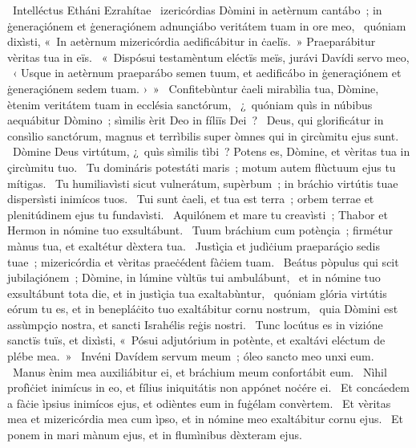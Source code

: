 {~Intelléctus Etháni Ezrahítae}
{%
~izericórdias Dòmini in aetèrnum cantábo~; in ġeneraçiónem et ġeneraçiónem adnunçiábo veritátem tuam in ore meo, 
~quóniam dixìsti, «~In aetèrnum mizericórdia aedificábitur in ċaelïs.~» Praeparábitur vèritas tua in eïs. 
~«~Dispósui testamèntum eléctïs meïs, jurávi Davídi servo meo, 
~‹ Usque in aetèrnum praeparábo semen tuum, et aedificábo in ġeneraçiónem et ġeneraçiónem sedem tuam. ›~»
~Confitebùntur ċaeli mirabìlia tua, Dòmine, ètenim veritátem tuam in ecclésia sanctórum, 
~¿~quóniam quìs in núbibus aequábitur Dòmino~; sìmilis èrit Deo in fíliïs Dei~? 
~Deus, qui glorificátur in consìlio sanctórum, magnus et terrìbilis super òmnes qui in çircùmitu ejus sunt. 
~Dòmine Deus virtútum, ¿~quìs sìmilis tìbi~? Potens es, Dòmine, et vèritas tua in çircùmitu tuo. 
~Tu domináris potestáti maris~; motum autem flùctuum ejus tu mítigas. 
~Tu humiliavìsti sicut vulnerátum, supèrbum~; in bráchio virtútis tuae dispersìsti inimícos tuos. 
~Tui sunt ċaeli, et tua est terra~; orbem terrae et plenitúdinem ejus tu fundavìsti. 
~Aquilónem et mare tu creavìsti~; Thabor et Hermon in nómine tuo exsultábunt. 
~Tuum bráchium cum potènçia~; firmétur mànus tua, et exaltétur dèxtera tua. 
~Justìçia et judìċium praeparáçio sedis tuae~; mizericórdia et vèritas praeċédent fàċiem tuam. 
~Beátus pòpulus qui scit jubilaçiónem~; Dòmine, in lúmine vùltüs tui ambulábunt, 
~et in nómine tuo exsultábunt tota die, et in justìçia tua exaltabùntur, 
~quóniam glória virtútis eórum tu es, et in benepláċito tuo exaltábitur cornu nostrum, 
~quia Dòmini est assùmpçio nostra, et sancti Israhélis reġis nostri. 
~Tunc locútus es in vizióne sanctïs tuïs, et dixìsti, «~Pósui adjutórium in potènte, et exaltávi eléctum de plébe mea.~» 
~Invéni Davídem servum meum~; óleo sancto meo unxi eum. 
~Manus ènim mea auxiliábitur ei, et bráchium meum confortábit eum. 
~Nìhil profìċiet inimícus in eo, et fílius iniquitátis non appónet noċére ei. 
~Et concáedem a fàċie ìpsius inimícos ejus, et odièntes eum in fuġélam convèrtem. 
~Et vèritas mea et mizericórdia mea cum ìpso, et in nómine meo exaltábitur cornu ejus. 
~Et ponem in mari mànum ejus, et in flumìnibus dèxteram ejus. 
}
